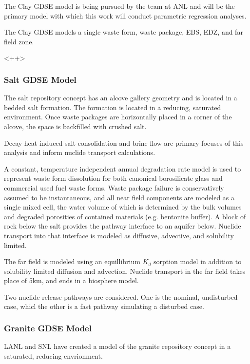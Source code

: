 The Clay \gls{GDSE} model is being pursued by the team at \gls{ANL} and will be 
the primary model with which this work will conduct parametric regression 
analyses. 

The Clay \gls{GDSE} models a single waste form, waste package, \gls{EBS}, 
\gls{EDZ}, and far field zone.

<++>

\subsubsection{Salt GDSE Model}

The salt repository concept has an alcove gallery geometry and is located in a 
bedded salt formation. The formation is located in a reducing, saturated 
environment. Once waste packages  are horizontally placed in a corner of the 
alcove, the space is backfilled with crushed salt. 

Decay heat induced salt consolidation and brine flow are primary focuses of 
this analysis and inform nuclide transport calculations. 

A constant, temperature independent annual degradation rate model is used to 
represent waste form dissolution for both canonical borosilicate glass and 
commercial used fuel waste forms. Waste package failure is conservatively 
assumed to be instantaneous, and all near field components are modeled as a 
single mixed cell, the water volume of which is determined by the bulk volumes 
and degraded porosities of contained materials (e.g. bentonite buffer). A block  
of rock below the salt provides the pathway interface to an aquifer below. 
Nuclide transport into that interface is modeled as diffusive, advective, and 
solubility limited.

The far field is modeled using an equillibrium $K_d$ sorption model in addition 
to solubility limited diffusion and advection. Nuclide transport in the far 
field takes place of 5km, and ends in a biosphere model. 

Two nuclide release pathways are considered. One is the nominal, undisturbed 
case, whicl the other is a fast pathway simulating a disturbed case.
\cite{nutt_generic_2011}

\subsubsection{Granite GDSE Model}

\gls{LANL} and \gls{SNL} have created a model of the granite repository concept  
in a saturated, reducing envrionment.

